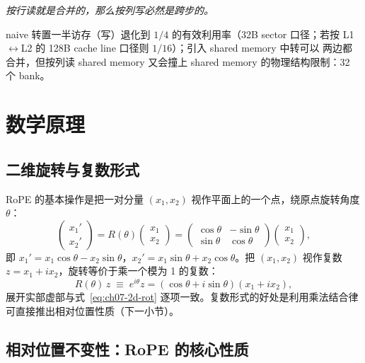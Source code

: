 \begin{center}
\textit{按行读就是合并的，那么按列写必然是跨步的。}
\end{center}

naive 转置一半访存（写）退化到 $1/4$ 的有效利用率（32B sector 口径；若按
L1$\leftrightarrow$L2 的 128B cache line 口径则 $1/16$）；引入 shared memory 中转可以
两边都合并，但按列读 shared memory 又会撞上 shared memory 的物理结构限制：32 个 bank。

\section{数学原理}

\subsection{二维旋转与复数形式}

RoPE 的基本操作是把一对分量 $(x_1, x_2)$ 视作平面上的一个点，绕原点旋转角度 $\theta$：
\begin{equation}
  \begin{pmatrix} x_1' \\ x_2' \end{pmatrix}
  = R(\theta)\begin{pmatrix} x_1 \\ x_2 \end{pmatrix}
  = \begin{pmatrix} \cos\theta & -\sin\theta \\ \sin\theta & \cos\theta \end{pmatrix}
  \begin{pmatrix} x_1 \\ x_2 \end{pmatrix},
  \label{eq:ch07-2d-rot}
\end{equation}
即 $x_1' = x_1\cos\theta - x_2\sin\theta$，$x_2' = x_1\sin\theta + x_2\cos\theta$。把 $(x_1,x_2)$ 视作复数 $z = x_1 + i x_2$，旋转等价于乘一个模为 1 的复数：
\begin{equation}
  R(\theta)\, z \;\equiv\; e^{i\theta} z = (\cos\theta + i\sin\theta)(x_1 + i x_2),
  \label{eq:ch07-complex}
\end{equation}
展开实部虚部与式~\eqref{eq:ch07-2d-rot} 逐项一致。复数形式的好处是利用乘法结合律可直接推出相对位置性质（下一小节）。

\subsection{相对位置不变性：RoPE 的核心性质}

